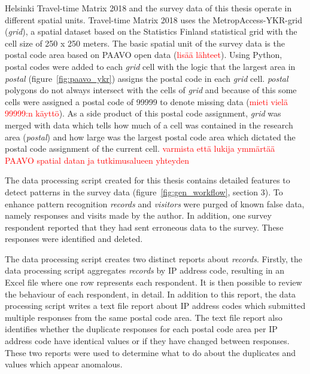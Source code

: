 Helsinki Travel-time Matrix 2018 and the survey data of this thesis operate in different spatial units. Travel-time Matrix 2018 uses the MetropAccess-YKR-grid (\textit{grid}), a spatial dataset based on the Statistics Finland statistical grid with the cell size of 250 x 250 meters. The basic spatial unit of the survey data is the postal code area based on PAAVO open data (\textcolor{red}{lisää lähteet}). Using Python, postal codes were added to each \textit{grid} cell with the logic that the largest area in \textit{postal} (figure~\ref{fig:paavo_ykr}) assigns the postal code in each \textit{grid} cell. \textit{postal} polygons do not always intersect with the cells of \textit{grid} and because of this some cells were assigned a postal code of 99999 to denote missing data (\textcolor{red}{mieti vielä 99999:n käyttö}). As a side product of this postal code assignment, \textit{grid} was merged with data which tells how much of a cell was contained in the research area (\textit{postal}) and how large was the largest postal code area which dictated the postal code assignment of the current cell. \textcolor{red}{varmista että lukija ymmärtää PAAVO spatial datan ja tutkimusalueen yhteyden}

The data processing script created for this thesis contains detailed features to detect patterns in the survey data (figure~\ref{fig:gen_workflow}, section 3). To enhance pattern recognition \textit{records} and \textit{visitors} were purged of known false data, namely responses and visits made by the author. In addition, one survey respondent reported that they had sent erroneous data to the survey. These responses were identified and deleted.

The data processing script creates two distinct reports about \textit{records}. Firstly, the data processing script aggregates \textit{records} by IP address code, resulting in an Excel file where one row represents each respondent. It is then possible to review the behaviour of each respondent, in detail. In addition to this report, the data processing script writes a text file report about IP address codes which submitted multiple responses from the same postal code area. The text file report also identifies whether the duplicate responses for each postal code area per IP address code have identical values or if they have changed between responses. These two reports were used to determine what to do about the duplicates and values which appear anomalous.

